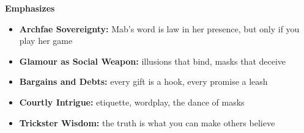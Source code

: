 \noindent\textbf{Emphasizes}
\begin{itemize}
  \item \textbf{Archfae Sovereignty:} Mab's word is law in her presence, but only if you play her game
  \item \textbf{Glamour as Social Weapon:} illusions that bind, masks that deceive
  \item \textbf{Bargains and Debts:} every gift is a hook, every promise a leash
  \item \textbf{Courtly Intrigue:} etiquette, wordplay, the dance of masks
  \item \textbf{Trickster Wisdom:} the truth is what you can make others believe
\end{itemize}